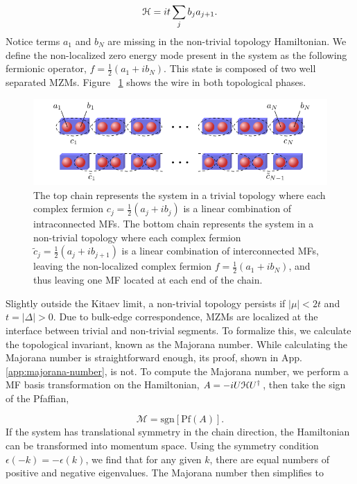 \begin{equation}
  \mathcal{H} = it \sum_j b_j a_{j+1}.
\end{equation}
Notice terms $a_1$ and $b_N$ are missing in the non-trivial topology Hamiltonian.
We define the non-localized zero energy mode present in the system as the following fermionic operator, $f = \tfrac{1}{2}(a_1 + i b_N)$.
This state is composed of two well separated MZMs.
Figure ~\ref{fig:kitaev-chain} shows the wire in both topological phases.

\begin{figure}
  \includegraphics[width=\textwidth]{./figures/kitaev-chain.pdf}
  \caption{The top chain represents the system in a trivial topology where each complex fermion $c_j = \tfrac{1}{2}(a_j + i b_j)$ is a linear combination of intraconnected MFs. The bottom chain represents the system in a non-trivial topology where each complex fermion $\tilde{c}_j = \tfrac{1}{2}(a_j + i b_{j+1})$ is a linear combination of interconnected MFs, leaving the non-localized complex fermion $f = \tfrac{1}{2}(a_1 + i b_N)$, and thus leaving one MF located at each end of the chain.}
  \label{fig:kitaev-chain}
\end{figure}

Slightly outside the Kitaev limit, a non-trivial topology persists if $|\mu| < 2t$ and $t = |\Delta| >0$.
Due to bulk-edge correspondence, MZMs are localized at the interface between trivial and non-trivial segments.
To formalize this, we calculate the topological invariant, known as the Majorana number.
While calculating the Majorana number is straightforward enough, its proof, shown in  App. \ref{app:majorana-number}, is not.
To compute the Majorana number, we perform a MF basis transformation on the Hamiltonian, $A = -iU \mathcal{H} U^{\dagger}$, then take the sign of the Pfaffian,

\begin{equation}
  \mathcal{M} = \text{sgn} [\text{Pf} (A)].
\end{equation}
If the system has translational symmetry in the chain direction, the Hamiltonian can be transformed into momentum space.
Using the symmetry condition $\epsilon(-k) = -\epsilon(k)$, we find that for any given $k$, there are equal numbers of positive and negative eigenvalues.
The Majorana number then simplifies to

